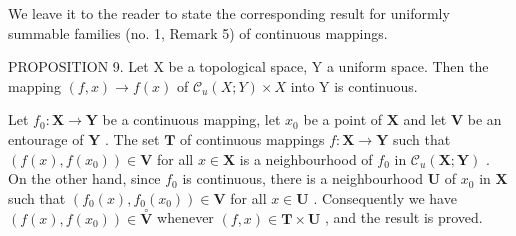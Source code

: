 We leave it to the reader to state the corresponding result for uniformly summable families (no. 1, Remark 5) of continuous mappings.

PROPOSITION 9. Let X be a topological space, Y a uniform space. Then the mapping \((f, x) \to f(x)\) of \(\mathcal{C}_u(X; Y) \times X\) into Y is continuous.

Let \(f_0: \mathbf{X} \to \mathbf{Y}\) be a continuous mapping, let \(x_0\) be a point of \(\mathbf{X}\) and let \(\mathbf{V}\) be an entourage of \(\mathbf{Y}\) . The set \(\mathbf{T}\) of continuous mappings \(f: \mathbf{X} \to \mathbf{Y}\) such that \((f(x), f(x_0)) \in \mathbf{V}\) for all \(x \in \mathbf{X}\) is a neighbourhood of \(f_0\) in \(\mathcal{C}_u(\mathbf{X}; \mathbf{Y})\) . On the other hand, since \(f_0\) is continuous, there is a neighbourhood \(\mathbf{U}\) of \(x_0\) in \(\mathbf{X}\) such that \((f_0(x), f_0(x_0)) \in \mathbf{V}\) for all \(x \in \mathbf{U}\) . Consequently we have \((f(x), f(x_0)) \in \overset{\circ}{\mathbf{V}}\) whenever \((f, x) \in \mathbf{T} \times \mathbf{U}\) , and the result is proved.


